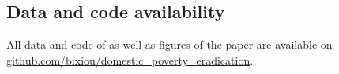   \begin{small} %





\section*{\normalsize Data and code availability}

All data and code of as well as figures of the paper are available on \href{https://github.com/bixiou/domestic_poverty_eradication}{github.com/bixiou/domestic\_poverty\_eradication}. 

\end{small}  %

\renewcommand{\url}[1]{\href{#1}{Link}} %

%  

